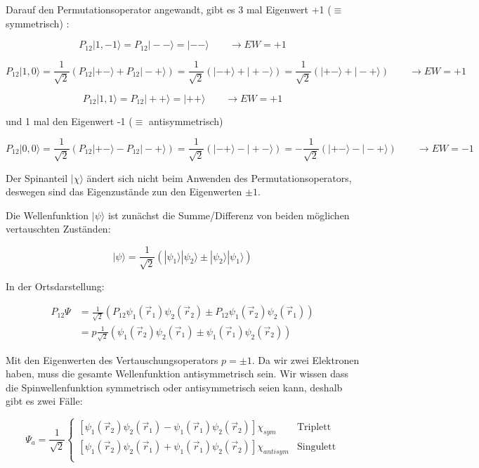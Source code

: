 Darauf den Permutationsoperator angewandt, gibt es 3 mal Eigenwert +1 (\(\equiv\) symmetrisch) :


\[P_{12}|1,-1 \rangle = P_{12}|--\rangle = |--\rangle  \qquad \rightarrow EW = +1  \]

\[ P_{12} |1,0\rangle = \frac{1}{\sqrt{2}}   (P_{12} |+-\rangle +  P_{12} |-+\rangle ) =\frac{1}{\sqrt{2}}   (|-+\rangle +  |+-\rangle ) =\frac{1}{\sqrt{2}}   (|+-\rangle +  |-+\rangle )  \qquad \rightarrow EW = +1 \]

\[P_{12}|1,1 \rangle = P_{12}|++\rangle = |++\rangle  \qquad \rightarrow EW = +1  \]

und 1 mal den Eigenwert -1 (\(\equiv\) antisymmetrisch)

\[ P_{12} |0,0\rangle = \frac{1}{\sqrt{2}}   (P_{12} |+-\rangle -  P_{12} |-+\rangle ) =\frac{1}{\sqrt{2}}   (|-+\rangle -  |+-\rangle ) =- \frac{1}{\sqrt{2}}   (|+-\rangle -  |-+\rangle )  \qquad \rightarrow EW = -1 \]

Der Spinanteil \(|\chi\rangle \) ändert sich nicht beim Anwenden des Permutationsoperators, deswegen sind das Eigenzustände zun den Eigenwerten \(\pm 1\).


Die Wellenfunktion \(|\psi\rangle \) ist zunächst die Summe/Differenz von beiden möglichen vertauschten Zuständen:

\[ |\psi\rangle = \frac{1}{\sqrt{2}} (|\psi_1\rangle |\psi_2\rangle \pm  |\psi_2\rangle |\psi_1\rangle)  \]

In der Ortsdarstellung:

\begin{align}
P_{12}\Psi &=   \frac{1}{\sqrt{2}} (P_{12} \psi_1(\vec r_1)\psi_2(\vec r_2)  \pm P_{12} \psi_1(\vec r_2) \psi_2(\vec r_1))   \\
&=  p  \frac{1}{\sqrt{2}} (  \psi_1(\vec r_2)\psi_2(\vec r_1)  \pm  \psi_1(\vec r_1) \psi_2(\vec r_2))  
\end{align}

Mit den Eigenwerten des Vertauschungsoperators \(p=\pm 1\). Da wir zwei Elektronen haben, muss die gesamte Wellenfunktion antisymmetrisch sein. Wir wissen dass die Spinwellenfunktion symmetrisch oder antisymmetrisch seien kann, deshalb gibt es zwei Fälle:

\[\boxed{\Psi_a = \frac{1}{\sqrt{2}} \begin{cases}
  [\psi_1(\vec r_2)\psi_2(\vec r_1)  - \psi_1(\vec r_1) \psi_2(\vec r_2)] \chi_{sym} & \text{Triplett}  \\
   [\psi_1(\vec r_2)\psi_2(\vec r_1)  + \psi_1(\vec r_1) \psi_2(\vec r_2)] \chi_{antisym} &\text{Singulett}  \\
\end{cases}}\]


